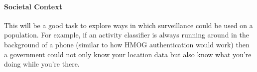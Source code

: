 \documentclass[letterpaper]{article}
\begin{document}
    \paragraph{Societal Context} This will be a good task to explore ways in which surveillance could be used on a population. For example, if an activity classifier is always running around in the background of a phone (similar to how HMOG authentication would work) then a government could not only know your location data but also know what you're doing while you're there.
\end{document}
